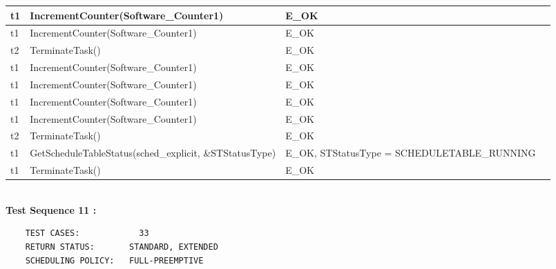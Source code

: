 \documentclass[10pt]{article}
\newlength{\Li}\settowidth{\Li}{Running}
\newlength{\Lii}\setlength{\Lii}{7cm}
\newlength{\Liiii}\setlength{\Liiii}{0.9cm}
\newlength{\Liii}\setlength{\Liii}{\textwidth} \addtolength{\Liii}{-\Li} \addtolength{\Liii}{-\Lii} \addtolength{\Liii}{-\Liiii}
\begin{document}
\begin{supertabular}{|p{\Li}|p{\Lii}|p{\Liii}|p{\Liiii}|}
	t1		& IncrementCounter(Software\_Counter1)						& E\_OK																	& \\ \hline
	t1		& IncrementCounter(Software\_Counter1)						& E\_OK																	& \\ \hline
	t2		& TerminateTask()											& E\_OK																	& \\ \hline
	t1		& IncrementCounter(Software\_Counter1)						& E\_OK																	& \\ \hline
	t1		& IncrementCounter(Software\_Counter1)						& E\_OK																	& \\ \hline
	t1		& IncrementCounter(Software\_Counter1)						& E\_OK																	& \\ \hline
	t1		& IncrementCounter(Software\_Counter1)						& E\_OK																	& \\ \hline
	t2		& TerminateTask()											& E\_OK																	& \\ \hline
	t1		& GetScheduleTableStatus(sched\_explicit, \&STStatusType)			& E\_OK, STStatusType = SCHEDULETABLE\_RUNNING 							& \\ \hline
	t1		& TerminateTask()											& E\_OK																	& \\ \hline
	\end{supertabular}\\
	
	\textbf{Test Sequence 11 :}
	\begin{lstlisting}
	TEST CASES:		       33
	RETURN STATUS:	  	 STANDARD, EXTENDED
	SCHEDULING POLICY:   FULL-PREEMPTIVE
	\end{lstlisting}
	
	
\end{document}
